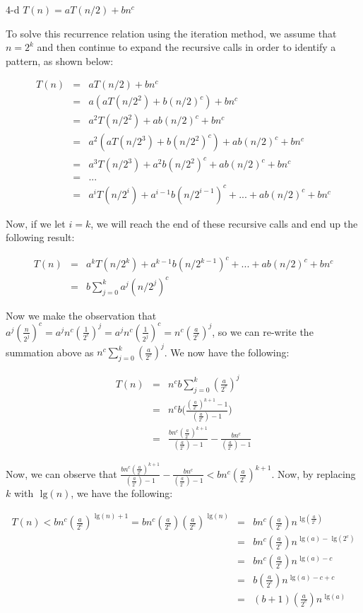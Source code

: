 \documentclass[11pt]{article}
\newcommand{\tlg}{\text{ lg}}
\begin{document}
\begin{prob}{4-d}
$T(n) = aT(n/2) + bn^{c}$
\end{prob}
\begin{sol} 

To solve this recurrence relation using the iteration method, we assume that $n = 2^k$ and then continue to expand the recursive calls in order to identify a pattern, as shown below:

\begin{eqnarray*}
T(n) & = & aT(n/2) + bn^c \\
& = & a(aT(n/2^2) + b(n/2)^c) + bn^c \\
& = & a^2T(n/2^2) + ab(n/2)^c + bn^c\\
& = & a^2(aT(n/2^3) + b(n/2^2)^c) + ab(n/2)^c + bn^c \\
& = & a^3T(n/2^3) + a^2b(n/2^2)^c + ab(n/2)^c + bn^c \\
& = & ... \\
& = & a^iT(n/2^i) + a^{i-1}b(n/2^{i-1})^c + ... + ab(n/2)^c + bn^c
\end{eqnarray*}

Now, if we let $i = k$, we will reach the end of these recursive calls and end up the following result:

\begin{eqnarray*}
T(n) & = & a^{k}T(n/2^k) + a^{k-1}b(n/2^{k-1})^c + ... + ab(n/2)^c + bn^c \\
& = & b\sum_{j=0}^{k} a^j(n/2^j)^c
\end{eqnarray*}

Now we make the observation that $a^j(\frac{n}{2^j})^{c} = a^jn^c(\frac{1}{2^c})^j = a^jn^c(\frac{1}{2^j})^c = n^c(\frac{a}{2^c})^j$, so we can re-write the summation above as $n^{c}\sum_{j=0}^{k} (\frac{a}{2^c})^{j}$. We now have the following:

\begin{eqnarray*}
T(n) & =& n^{c}b\sum_{j=0}^{k} (\frac{a}{2^c})^j \\
& = & n^{c}b\Bigg(\frac{(\frac{a}{2^c})^{k+1} - 1}{(\frac{a}{2^c}) - 1}\Bigg) \\
& = & \frac{bn^c(\frac{a}{2^c})^{k+1}}{(\frac{a}{2^c}) - 1} - \frac{bn^c}{(\frac{a}{2^c}) - 1}
\end{eqnarray*}

Now, we can observe that $\frac{bn^c(\frac{a}{2^c})^{k+1}}{(\frac{a}{2^c}) - 1} - \frac{bn^c}{(\frac{a}{2^c}) - 1} < bn^c(\frac{a}{2^c})^{k+1}$. Now, by replacing $k$ with $\tlg(n)$, we have the following:

\begin{eqnarray*}
T(n) <  bn^c(\frac{a}{2^c})^{\tlg(n) + 1} = bn^c(\frac{a}{2^c})(\frac{a}{2^c})^{\tlg(n)} & = & bn^c(\frac{a}{2^c})n^{\tlg(\frac{a}{2^c})} \\
& = & bn^c(\frac{a}{2^c})n^{\tlg(a) - \tlg(2^c)} \\
& = & bn^c(\frac{a}{2^c})n^{\tlg(a) - c} \\
& = & b(\frac{a}{2^c})n^{\tlg(a) - c + c} \\
& = & (b+1)(\frac{a}{2^c})n^{\tlg(a)}
\end{eqnarray*}


\end{sol}
\end{document}
